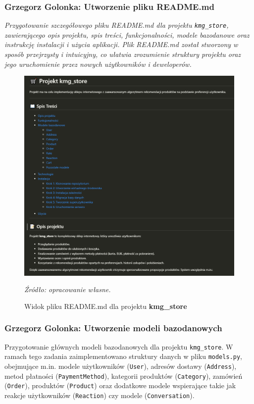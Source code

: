 \documentclass[12pt,a4paper,oneside]{article}
\theoremstyle{definition}
\numberwithin{equation}{section}
\begin{document}
\subsubsection{Grzegorz Golonka: Utworzenie pliku README.md }
\label{section:1.3.19}
\textit{Przygotowanie szczegółowego pliku README.md dla projektu \texttt{kmg\_store},
 zawierającego opis projektu, spis treści, funkcjonalności,
 modele bazodanowe oraz instrukcję instalacji i użycia aplikacji.
Plik README.md został stworzony w sposób przejrzysty i intuicyjny,
co ułatwia zrozumienie struktury projektu oraz jego uruchomienie przez nowych użytkowników i deweloperów.}
\begin{figure}[H]
    \centering
    \includegraphics[width=0.9\columnwidth]{images/krzysztofBImages/readme_preview.png}
    \caption{Widok pliku README.md dla projektu \textbf{kmg\_store}}
    \emph{Źródło: opracowanie własne.}
\end{figure}
%
%
\subsubsection{Grzegorz Golonka: Utworzenie modeli bazodanowych}
\label{section:1.3.20}
Przygotowanie głównych modeli bazodanowych dla projektu \texttt{kmg\_store}.
W ramach tego zadania zaimplementowano struktury danych w pliku \texttt{models.py},
obejmujące m.in. modele użytkowników (\texttt{User}), adresów dostawy (\texttt{Address}),
metod płatności (\texttt{PaymentMethod}), kategorii produktów (\texttt{Category}),
zamówień (\texttt{Order}), produktów (\texttt{Product}) oraz dodatkowe modele wspierające
takie jak reakcje użytkowników (\texttt{Reaction}) czy modele (\texttt{Conversation}).
\end{document}
